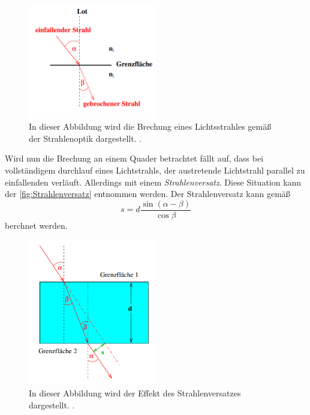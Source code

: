 \begin{figure}
  \centering
  \includegraphics[width=0.5\textwidth]{content/Brechung.png}
  \caption{In dieser Abbildung wird die Brechung eines Lichtsstrahles gemäß der Strahlenoptik dargestellt. \cite{v400}.}
  \label{fig:Brechung}
\end{figure}

Wird nun die Brechung an einem Quader betrachtet fällt auf, dass bei vollständigem durchlauf eines Lichtstrahls, der austretende Lichtstrahl parallel zu einfallenden verläuft.
Allerdings mit einem \textit{Strahlenversatz}. Diese Situation kann der \autoref{fig:Strahlenversatz} entnommen werden.
Der Strahlenversatz kann gemäß
\begin{equation}
  \label{eqn:Strahlenversatz}
  s = d\frac{\sin(\alpha - \beta)}{\cos\beta}
\end{equation}
berchnet werden.

\begin{figure}
  \centering
  \includegraphics[width=0.5\textwidth]{content/Quader.png}
  \caption{In dieser Abbildung wird der Effekt des Strahlenversatzes dargestellt. \cite{v400}.}
  \label{fig:Strahlenversatz}
\end{figure}

